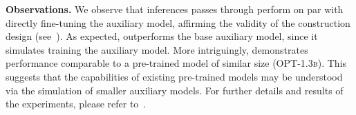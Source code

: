 \textbf{Observations.} We observe that inferences passes through \simulator{} perform on par with directly fine-tuning the auxiliary model, affirming the validity of the construction design (see~). As expected, \simulator{} outperforms the base auxiliary model, since it simulates training the auxiliary model. More intriguingly, \simulator{} demonstrates performance comparable to a pre-trained model of similar size (\textsc{OPT-1.3b}). This suggests that the capabilities of existing pre-trained models may be understood via the simulation of smaller auxiliary models. For further details and results of the experiments, please refer to~.






